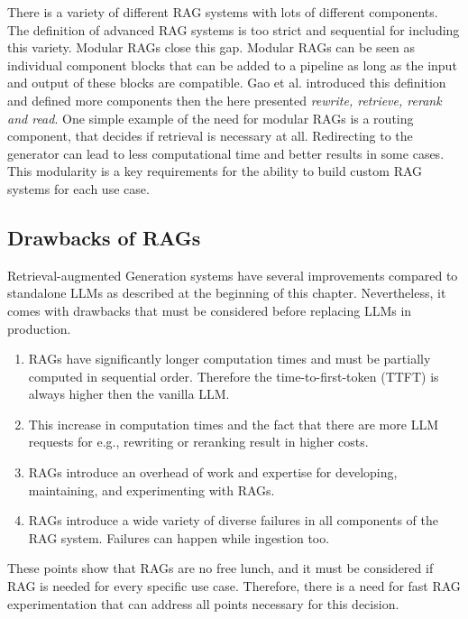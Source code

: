 There is a variety of different RAG systems with lots of different components. The definition of advanced RAG systems is too strict and sequential for including this variety. Modular RAGs close this gap. Modular RAGs can be seen as individual component blocks that can be added to a pipeline as long as the input and output of these blocks are compatible. Gao et al. introduced this definition and defined more components then the here presented \textit{rewrite, retrieve, rerank and read}.\cite{Gao.18.12.2023} One simple example of the need for modular RAGs is a routing component, that decides if retrieval is necessary at all. Redirecting to the generator can lead to less computational time and better results in some cases.\cite{Mallen.20.12.2022} This modularity is a key requirements for the ability to build custom RAG systems for each use case.


\subsection{Drawbacks of RAGs}
\label{sec:drawbacks}
Retrieval-augmented Generation systems have several improvements compared to standalone LLMs as described at the beginning of this chapter. Nevertheless, it comes with drawbacks that must be considered before replacing LLMs in production.

\begin{enumerate}
    \item RAGs have significantly longer computation times and must be partially computed in sequential order. Therefore the time-to-first-token (TTFT) is always higher then the vanilla LLM.
    \item This increase in computation times and the fact that there are more LLM requests for e.g., rewriting or reranking result in higher costs.
    \item RAGs introduce an overhead of work and expertise for developing, maintaining, and experimenting with RAGs.
    \item RAGs introduce a wide variety of diverse failures in all components of the RAG system. Failures can happen while ingestion too.
\end{enumerate}

These points show that RAGs are no free lunch, and it must be considered if RAG is needed for every specific use case. Therefore, there is a need for fast RAG experimentation that can address all points necessary for this decision.
